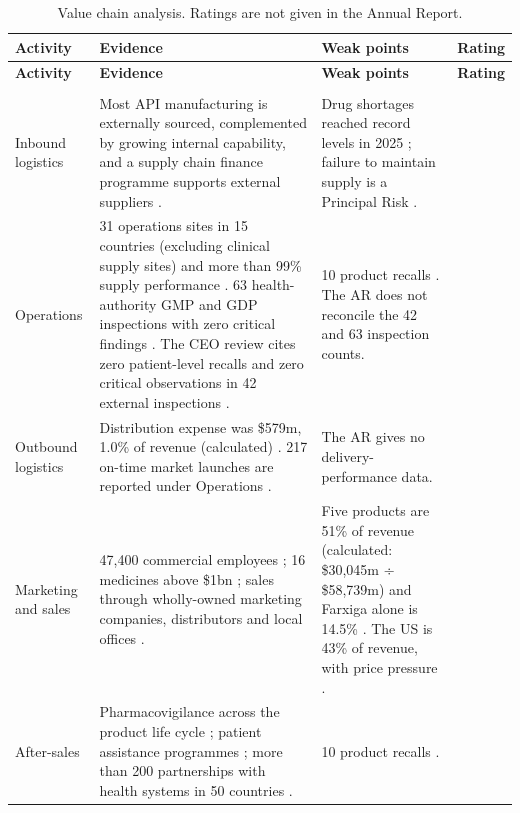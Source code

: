 \begin{xltabular}{\linewidth}{@{}N{2.45cm}YYp{2.05cm}@{}}
\caption{Value chain analysis. Ratings are not given in the Annual Report.}\label{tab:cadeia-valor}\\*
\toprule
\textbf{Activity} & \textbf{Evidence} & \textbf{Weak points} & \textbf{Rating} \\*
\midrule
\endfirsthead
\toprule
\textbf{Activity} & \textbf{Evidence} & \textbf{Weak points} & \textbf{Rating} \\*
\midrule
\endhead
\bottomrule
\endfoot
{} \\*
\midrule
Inbound logistics & Most API manufacturing is externally sourced, complemented by growing internal capability, and a supply chain finance programme supports external suppliers \cite[p.~33]{AR}. & Drug shortages reached record levels in 2025 \cite[p.~33]{AR}; failure to maintain supply is a Principal Risk \cite[p.~48]{AR}. &  \\
Operations & 31 operations sites in 15 countries (excluding clinical supply sites) and more than 99\% supply performance \cite[pp.~4, 33]{AR}. 63 health-authority GMP and GDP inspections with zero critical findings \cite[p.~31]{AR}. The CEO review cites zero patient-level recalls and zero critical observations in 42 external inspections \cite[p.~4]{AR}. & 10 product recalls \cite[p.~31]{AR}. The AR does not reconcile the 42 and 63 inspection counts. &  \\
Outbound logistics & Distribution expense was \$579m, 1.0\% of revenue (calculated) \cite[p.~125]{AR}. 217 on-time market launches are reported under Operations \cite[pp.~27, 33]{AR}. & The AR gives no delivery-performance data. &  \\
Marketing and sales & 47,400 commercial employees \cite[p.~27]{AR}; 16 medicines above \$1bn \cite[p.~4]{AR}; sales through wholly-owned marketing companies, distributors and local offices \cite[p.~32]{AR}. & Five products are 51\% of revenue (calculated: \$30,045m ÷ \$58,739m) and Farxiga alone is 14.5\% \cite[p.~56]{AR}. The US is 43\% of revenue, with price pressure \cite[pp.~2, 32]{AR}. &   \\
After-sales & Pharmacovigilance across the product life cycle \cite[p.~31]{AR}; patient assistance programmes \cite[p.~41]{AR}; more than 200 partnerships with health systems in 50 countries \cite[p.~4]{AR}. & 10 product recalls \cite[p.~31]{AR}. &  \\

\end{xltabular}
